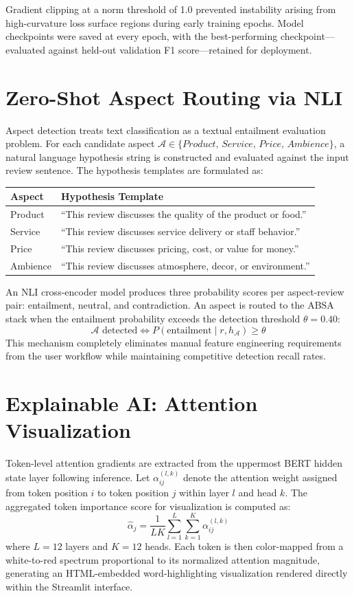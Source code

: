 \documentclass[12pt,a4paper]{report}
\begin{document}
Gradient clipping at a norm threshold of 1.0 prevented instability arising from high-curvature loss surface regions during early training epochs. Model checkpoints were saved at every epoch, with the best-performing checkpoint—evaluated against held-out validation F1 score—retained for deployment.

\section{Zero-Shot Aspect Routing via NLI}
Aspect detection treats text classification as a textual entailment evaluation problem. For each candidate aspect $\mathcal{A} \in \{\textit{Product, Service, Price, Ambience}\}$, a natural language hypothesis string is constructed and evaluated against the input review sentence. The hypothesis templates are formulated as:

\begin{center}
\begin{tabular}{ll}
\textbf{Aspect} & \textbf{Hypothesis Template} \\
\hline
Product  & ``This review discusses the quality of the product or food.'' \\
Service  & ``This review discusses service delivery or staff behavior.'' \\
Price    & ``This review discusses pricing, cost, or value for money.'' \\
Ambience & ``This review discusses atmosphere, decor, or environment.'' \\
\end{tabular}
\end{center}

An NLI cross-encoder model produces three probability scores per aspect-review pair: entailment, neutral, and contradiction. An aspect is routed to the ABSA stack when the entailment probability exceeds the detection threshold $\theta = 0.40$:
\begin{equation}
\mathcal{A} \text{ detected} \iff P(\text{entailment} \mid r, h_\mathcal{A}) \geq \theta
\end{equation}
This mechanism completely eliminates manual feature engineering requirements from the user workflow while maintaining competitive detection recall rates.

\section{Explainable AI: Attention Visualization}
Token-level attention gradients are extracted from the uppermost BERT hidden state layer following inference. Let $\alpha_{ij}^{(l,k)}$ denote the attention weight assigned from token position $i$ to token position $j$ within layer $l$ and head $k$. The aggregated token importance score for visualization is computed as:
\begin{equation}
\hat{\alpha}_j = \frac{1}{LK}\sum_{l=1}^{L}\sum_{k=1}^{K} \alpha_{ij}^{(l,k)}
\end{equation}
where $L=12$ layers and $K=12$ heads. Each token is then color-mapped from a white-to-red spectrum proportional to its normalized attention magnitude, generating an HTML-embedded word-highlighting visualization rendered directly within the Streamlit interface.
\end{document}
